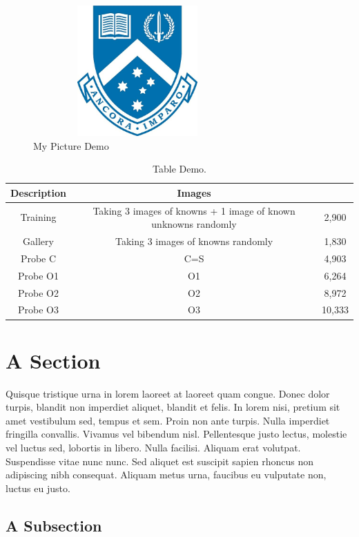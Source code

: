 \begin{figure}
\centering
  \includegraphics[width=8cm,height=5cm]{figures/crest.jpg}%
  \caption{My Picture Demo\label{fig.demo1}}
\end{figure}

\begin{table}[]
\caption{Table Demo.\label{table.demo1}}
\begin{tabular}{|c|c|c|}
\hline
Description & Images &  \\ \hline
Training & Taking 3 images of knowns + 1 image of known unknowns randomly & 2,900 \\ \hline
Gallery & Taking 3 images of knowns randomly & 1,830 \\ \hline
Probe C & C=S & 4,903 \\ \hline
Probe O1 & O1 & 6,264 \\ \hline
Probe O2 & O2 & 8,972 \\ \hline
Probe O3 & O3 & 10,333 \\ \hline
\end{tabular}
\end{table}

\section{A Section}

Quisque tristique urna in lorem laoreet at laoreet quam congue. Donec dolor turpis, blandit non imperdiet aliquet, blandit et felis. In lorem nisi, pretium sit amet vestibulum sed, tempus et sem. Proin non ante turpis. Nulla imperdiet fringilla convallis. Vivamus vel bibendum nisl. Pellentesque justo lectus, molestie vel luctus sed, lobortis in libero. Nulla facilisi. Aliquam erat volutpat. Suspendisse vitae nunc nunc. Sed aliquet est suscipit sapien rhoncus non adipiscing nibh consequat. Aliquam metus urna, faucibus eu vulputate non, luctus eu justo.

\subsection{A Subsection}

